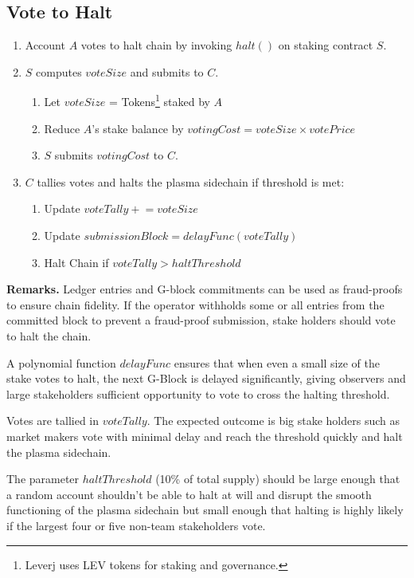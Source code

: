 \documentclass[12pt,a4paper]{article}
\begin{document}
\subsection{Vote to Halt}\label{gp:vote2halt}
\begin{mdframed}
\begin{enumerate}
    \item Account $A$ votes to halt chain by invoking \(halt()\) on staking contract $S$.
    \item $S$ computes $voteSize$ and submits to $C$.
    \begin{enumerate}
        \item Let $voteSize$ = Tokens\footnote{Leverj uses LEV tokens for staking and governance.} staked by $A$
        \item Reduce $A$’s stake balance by \(votingCost = voteSize \times votePrice\)
        \item $S$ submits $votingCost$ to $C$.
    \end{enumerate}
    \item $C$ tallies votes and halts the plasma sidechain if threshold is met:
    \begin{enumerate}
        \item Update \(voteTally \mathrel{+}= voteSize\)
        \item Update \(submissionBlock = delayFunc(voteTally)\)
        \item Halt Chain if \(voteTally > haltThreshold\)
    \end{enumerate}
\end{enumerate}
\end{mdframed}

\textbf{Remarks.} Ledger entries and G-block commitments can be used as fraud-proofs to ensure chain fidelity. If the operator  withholds some or all entries from the committed block to prevent a fraud-proof submission, stake holders should vote to halt the chain.

A polynomial function $delayFunc$ ensures that when even a small size of the stake votes to halt, the next G-Block is delayed significantly, giving observers and large stakeholders sufficient opportunity to vote to cross the halting threshold. 

Votes are tallied in $voteTally$. The expected outcome is big stake holders such as market makers vote with minimal delay and reach the threshold quickly and halt the plasma sidechain.

The parameter $haltThreshold$ (10\% of total supply) should be large enough that a random account shouldn’t be able to halt at will and disrupt the smooth functioning of the plasma sidechain but small enough that halting is highly likely if the largest four or five non-team stakeholders vote.
\end{document}
